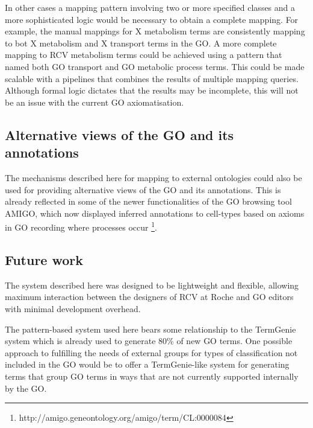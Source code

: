 \documentclass[runningheads,a4paper]{llncs}
\begin{document}
{In other cases a mapping pattern involving two or more specified classes and a more sophisticated logic would be necessary to obtain a complete mapping.  For example, the manual mappings for X metabolism terms are consistently mapping to bot X metabolism and X transport terms in the \ac{GO}. A more complete mapping to RCV metabolism terms could be achieved using a pattern that named both \ac{GO} transport and \ac{GO} metabolic process terms.  This could be made scalable with a pipelines that combines the results of multiple mapping queries.  Although formal logic dictates that the results may be incomplete, this will not be an issue with the current GO axiomatisation.


\subsection{Alternative views of the \ac{GO} and its annotations}

The mechanisms described here for mapping to external ontologies could also be used for providing alternative views of the \ac{GO} and its annotations.  This is already reflected in some of the newer functionalities of the \ac{GO} browsing tool AMIGO, which now displayed inferred annotations to cell-types based on axioms in \ac{GO} recording where processes occur \footnote{http://amigo.geneontology.org/amigo/term/CL:0000084}.

\subsection{Future work}

The system described here was designed to be lightweight and flexible, allowing maximum interaction between the designers of RCV at Roche and \ac{GO} editors with minimal development overhead.

The pattern-based system used here bears some relationship to the TermGenie system \cite{Dietze2014} which is already used to generate 80\% of new \ac{GO} terms.  One possible approach to fulfilling the needs of external groups for types of classification not included in the \ac{GO} would be to offer a TermGenie-like system for generating terms that group \ac{GO} terms in ways that are not currently supported internally by the \ac{GO}.

%
%
%

}
\end{document}
